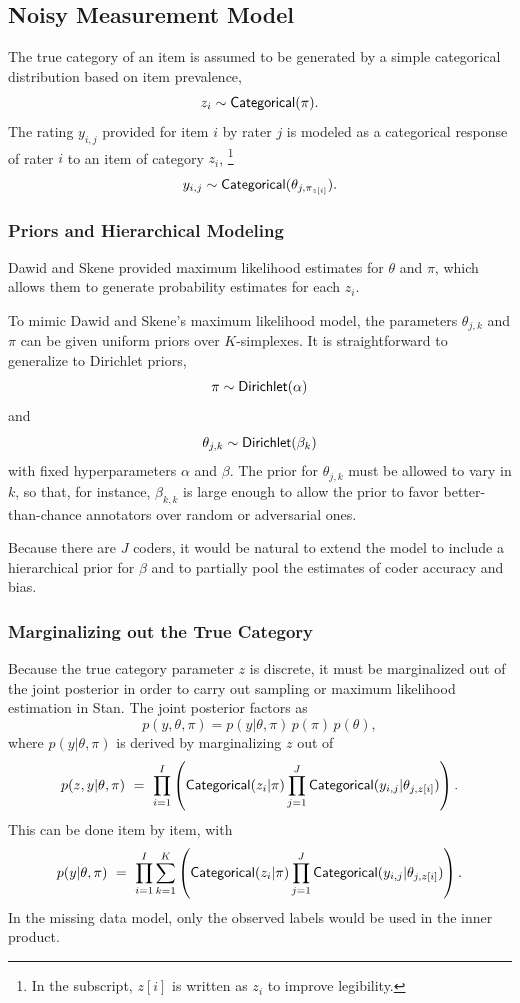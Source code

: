 \subsection{Noisy Measurement Model}

The true category of an item is assumed to be generated by a simple
categorical distribution based on item prevalence,
\[
z_i \sim \distro{Categorical}(\pi).
\]
%
The rating $y_{i,j}$ provided for item $i$ by rater $j$ is modeled as
a categorical response of rater $i$ to an item of category $z_i$,%
%
\footnote{In the subscript, $z[i]$ is written as $z_i$ to
  improve legibility.}
%
\[
y_{i,j} \sim \distro{Categorical}(\theta_{j,\pi_{z[i]}}).
\]

\subsubsection{Priors and Hierarchical Modeling}

Dawid and Skene provided maximum likelihood estimates for $\theta$ and
$\pi$, which allows them to generate probability estimates for each $z_i$.

To mimic Dawid and Skene's maximum likelihood model, the parameters
$\theta_{j,k}$ and $\pi$ can be given uniform priors over
$K$-simplexes.  It is straightforward to generalize to Dirichlet
priors,
\[
\pi \sim \distro{Dirichlet}(\alpha)
\]
and
\[
\theta_{j,k} \sim \distro{Dirichlet}(\beta_k)
\]
with fixed hyperparameters $\alpha$ and $\beta$.  The prior for
$\theta_{j,k}$ must be allowed to vary in $k$, so that, for instance,
$\beta_{k,k}$ is large enough to allow the prior to favor
better-than-chance annotators over random or adversarial ones.

Because there are $J$ coders, it would be natural to extend the model
to include a hierarchical prior for $\beta$ and to partially pool the
estimates of coder accuracy and bias.

\subsubsection{Marginalizing out the True Category}

Because the true category parameter $z$ is discrete, it must be
marginalized out of the joint posterior in order to carry out sampling
or maximum likelihood estimation in Stan. The joint posterior factors
as
\[
p(y, \theta, \pi) = p(y | \theta,\pi) \, p(\pi) \, p(\theta),
\]
where $p(y | \theta,\pi)$ is derived by marginalizing $z$ out of
%
\[
p(z, y | \theta, \pi)
\ = \
\prod_{i=1}^I \left( \distro{Categorical}(z_i | \pi)
                     \prod_{j=1}^J
                     \distro{Categorical}(y_{i,j}|\theta_{j,z[i]})
              \right).
\]
%
This can be done item by item, with
\[
p(y | \theta, \pi)
\ = \
\prod_{i=1}^I \sum_{k=1}^K  
  \left( \distro{Categorical}(z_i | \pi)
         \prod_{j=1}^J
         \distro{Categorical}(y_{i,j}|\theta_{j,z[i]})
  \right).
\]            
%
In the missing data model, only the observed labels would be used in
the inner product.

